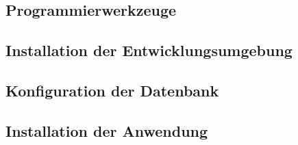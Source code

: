 \documentclass[12pt, oneside, a4paper]{article}		%
\begin{document}
\subsection{Programmierwerkzeuge}
\blindtext

\subsection{Installation der Entwicklungsumgebung}
\blindtext

\subsection{Konfiguration der Datenbank}
\blindtext

\subsection{Installation der Anwendung}
\blindtext
\end{document}
